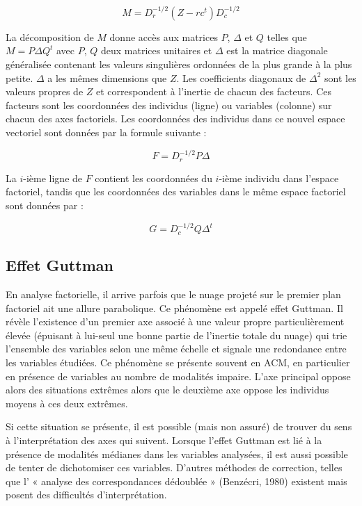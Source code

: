 \documentclass[12pt,a4paper]{reedthesis}
\begin{document}
\[M=D_{r}^{-1/2}(Z-rc^{t})D_{c}^{-1/2}\]

La décomposition de \(M\) donne accès aux matrices \(P\), \(\Delta\) et \(Q\) telles que \(M=P\Delta Q^{t}\) avec \(P\), \(Q\) deux matrices unitaires et \(\Delta\) est la matrice diagonale généralisée contenant les valeurs singulières ordonnées de la plus grande à la plus petite. \(\Delta\) a les mêmes dimensions que \(Z\). Les coefficients diagonaux de \(\Delta ^{2}\) sont les valeurs propres de \(Z\) et correspondent à l'inertie de chacun des facteurs. Ces facteurs sont les coordonnées des individus (ligne) ou variables (colonne) sur chacun des axes factoriels. Les coordonnées des individus dans ce nouvel espace vectoriel sont données par la formule suivante :

\[F=D_{r}^{-1/2}P\Delta\]

La \(i\)-ième ligne de \(F\) contient les coordonnées du \(i\)-ième individu dans l'espace factoriel, tandis que les coordonnées des variables dans le même espace factoriel sont données par :

\[G=D_{c}^{-1/2}Q\Delta ^{t}\]

\hypertarget{sec:annexeAFACMguttman}{%
\subsection{Effet Guttman}\label{sec:annexeAFACMguttman}}

En analyse factorielle, il arrive parfois que le nuage projeté sur le premier plan factoriel ait une allure parabolique. Ce phénomène est appelé effet Guttman. Il révèle l'existence d'un premier axe associé à une valeur propre particulièrement élevée (épuisant à lui-seul une bonne partie de l'inertie totale du nuage) qui trie l'ensemble des variables selon une même échelle et signale une redondance entre les variables étudiées. Ce phénomène se présente souvent en ACM, en particulier en présence de variables au nombre de modalités impaire. L'axe principal oppose alors des situations extrêmes alors que le deuxième axe oppose les individus moyens à ces deux extrêmes.

Si cette situation se présente, il est possible (mais non assuré) de trouver du sens à l'interprétation des axes qui suivent. Lorsque l'effet Guttman est lié à la présence de modalités médianes dans les variables analysées, il est aussi possible de tenter de dichotomiser ces variables. D'autres méthodes de correction, telles que l' « analyse des correspondances dédoublée » (Benzécri, 1980) existent mais posent des difficultés d'interprétation.
\end{document}
